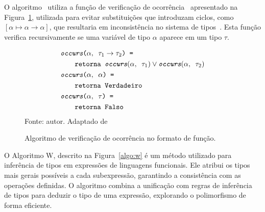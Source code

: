 O algoritmo \Unify\ utiliza a função de verificação de
ocorrência \Occurs\ apresentado na Figura~\ref{algo:occurs}, utilizada
para evitar substituições que introduzam ciclos, como $[\alpha\mapsto\alpha\to\alpha]$,
que resultaria em inconsistência no sistema de tipos~\cite{RIBEIRO2016}.
Esta função verifica recursivamente se uma variável de tipo $\alpha$ aparece em um tipo $\tau$.

\begin{figure}[ht!]
  \caption{Algoritmo de verificação de ocorrência no formato de função.}
  \centering
  \begin{align*}
     & \texttt{\ensuremath{\textit{occurs}}($\alpha, \texttt{ } \tau_1 \to \tau_2$) = }                                                       \\
     & \qquad{}\texttt{\ensuremath{\text{retorna}}\ensuremath{\texttt{ }}$\textit{occurs}(\alpha, \texttt{ } \tau_1) \lor \textit{occurs}(\alpha, \texttt{ }\tau_2)$} \\
     & \texttt{\ensuremath{\textit{occurs}}($\alpha, \texttt{ } \alpha$) = }                                                                  \\
     & \qquad{}\texttt{\ensuremath{\text{retorna}}\ensuremath{\texttt{ }}\ensuremath{\texttt{Verdadeiro}}}                                                                         \\
     & \texttt{\ensuremath{\textit{occurs}}($\alpha, \texttt{ } \tau$) = }                                                                    \\
     & \qquad{}\texttt{\ensuremath{\text{retorna}}\ensuremath{\texttt{ }}\ensuremath{\texttt{Falso}}}
  \end{align*}
  \small{Fonte: autor. Adaptado de~\cite{RIBEIRO2016}}\label{algo:occurs}
\end{figure}

O Algoritmo W, descrito na Figura~\ref{algo:w} é um método utilizado para inferência de tipos em expressões de linguagens funcionais.
Ele atribui os tipos mais gerais possíveis a cada subexpressão, garantindo a consistência com as operações definidas.
O algoritmo combina a unificação com regras de inferência de tipos para deduzir o tipo de uma expressão, explorando o polimorfismo de forma eficiente.

